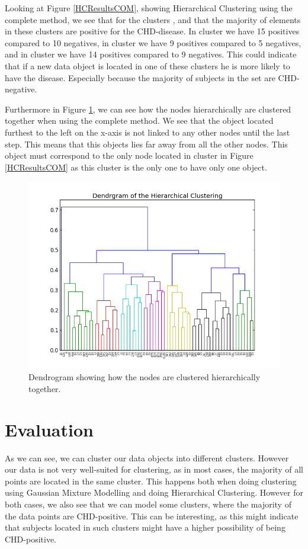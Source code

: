 Looking at Figure \ref{HCResultsCOM}, showing Hierarchical Clustering using the complete method, we see that for the clusters \HCCOMA{}, \HCCOMB{} and \HCCOMC{} that the majority of elements in these clusters are positive for the CHD-disease. In cluster \HCCOMA{} we have 15 positives compared to 10 negatives, in cluster \HCCOMB{} we have 9 positives compared to 5 negatives, and in cluster \HCCOMC{} we have 14 positives compared to 9 negatives. This could indicate that if a new data object is located in one of these clusters he is more likely to have the disease. Especially because the majority of subjects in the set are CHD-negative.

Furthermore in Figure \ref{dendrogram}, we can see how the nodes hierarchically are clustered together when using the complete method. We see that the object located furthest to the left on the x-axis is not linked to any other nodes until the last step. This means that this objects lies far away from all the other nodes. This object must correspond to the only node located in cluster \HCCOMS{} in Figure \ref{HCResultsCOM} as this cluster is the only one to have only one object.

\begin{figure}[h]
\includegraphics[scale=0.5]{pictures/dendrogram.png}
\caption{Dendrogram showing how the nodes are clustered hierarchically together.}
\label{dendrogram}
\end{figure}


\section{Evaluation}

As we can see, we can cluster our data objects into different clusters. However our data is not very well-suited for clustering, as in most cases, the majority of all points are located in the same cluster. This happens both when doing clustering using Gaussian Mixture Modelling and doing Hierarchical Clustering. However for both cases, we also see that we can model some clusters, where the majority of the data points are CHD-positive. This can be interesting, as this might indicate that subjects located in such clusters might have a higher possibility of being CHD-positive.